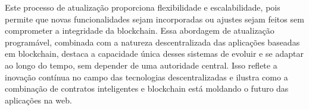 Este processo de atualização proporciona flexibilidade e escalabilidade, pois permite que novas funcionalidades sejam incorporadas ou ajustes sejam feitos sem comprometer a integridade da blockchain. Essa abordagem de atualização programável, combinada com a natureza descentralizada das aplicações baseadas em blockchain, destaca a capacidade única desses sistemas de evoluir e se adaptar ao longo do tempo, sem depender de uma autoridade central. Isso reflete a inovação contínua no campo das tecnologias descentralizadas e ilustra como a combinação de contratos inteligentes e blockchain está moldando o futuro das aplicações na web.
